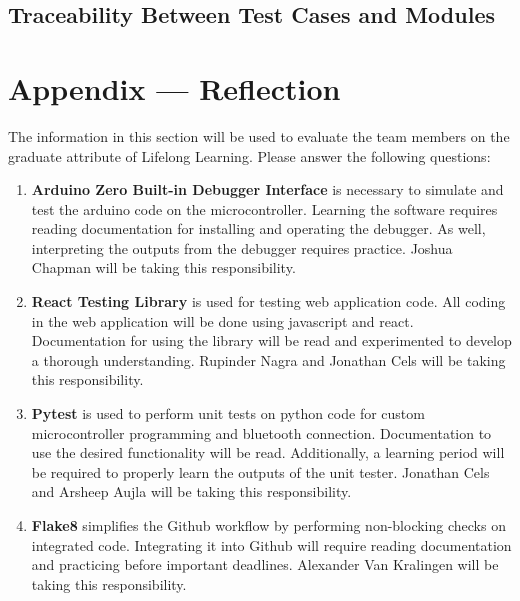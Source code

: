 \documentclass[12pt, titlepage]{article}
\begin{document}
\subsection{Traceability Between Test Cases and Modules}

				




\newpage

\section*{Appendix --- Reflection}

The information in this section will be used to evaluate the team members on the
graduate attribute of Lifelong Learning.  Please answer the following questions:

\begin{enumerate}
  \item \textbf{Arduino Zero Built-in Debugger Interface} is 
  necessary to simulate and test the arduino code on the microcontroller. 
  Learning the software requires reading documentation for installing 
  and operating the debugger. As well, interpreting the outputs from 
  the debugger requires practice. Joshua Chapman will be taking this
  responsibility.
  \item \textbf{React Testing Library} is used for testing web 
  application code. All coding in the web application will be done 
  using javascript and react. Documentation for using the library will be read
  and experimented to develop a thorough understanding.
   Rupinder Nagra and Jonathan Cels will be taking this responsibility. 
  \item \textbf{Pytest} is used to perform unit tests on python code
  for custom microcontroller programming and bluetooth connection. Documentation to 
  use the desired functionality will be read. Additionally, a learning period will 
  be required to properly learn the outputs of the unit tester. 
  Jonathan Cels and Arsheep Aujla will be taking this responsibility.
  \item \textbf{Flake8} simplifies the Github workflow by performing non-blocking 
  checks on integrated code. Integrating it into Github will require reading 
  documentation and practicing before important deadlines. Alexander Van Kralingen 
  will be taking this responsibility.
\end{enumerate}
\end{document}
